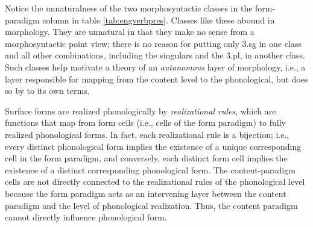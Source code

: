 Notice the unnaturalness of the two morphosyntactic classes in
the form-paradigm column in table \ref{tab:engverbpres}. %
Classes like these abound in morphology.  
They are unnatural in that they make no sense from a morphosyntactic point view; 
there is no reason for putting only 3.sg in one class and all other combinations, 
including the singulars and the 3.pl, in another class. Such classes help motivate 
a theory of an \emph{autonomous} layer of morphology, i.e., a layer responsible 
for mapping from the content level to the phonological, but does so by 
to its own terms.

Surface forms are realized phonologically by \emph{realizational rules}, which 
are functions that map from form cells (i.e., cells of the form paradigm) to fully 
realized phonological forms. In fact, each realizational rule is a bijection; i.e., every 
distinct phonological form implies the existence of a unique corresponding cell in 
the form paradigm, and conversely, each distinct form cell implies the existence of 
a distinct corresponding phonological form. The %
content-paradigm cells are not directly connected to the realizational rules of 
the phonological level because the form paradigm acts as an intervening layer 
between the content paradigm and the level of phonological realization. 
Thus, the content paradigm cannot directly influence phonological form. 

